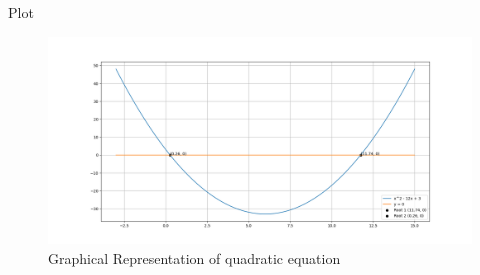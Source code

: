 \documentclass{beamer}
\begin{document}
\begin{frame}{Plot}
    \begin{figure}
        \centering
        \includegraphics[width=\columnwidth]{../figs/figure_py.png}
        \caption{Graphical Representation of quadratic equation}
        \label{fig:final_plot}
    \end{figure}
\end{frame}
\end{document}
